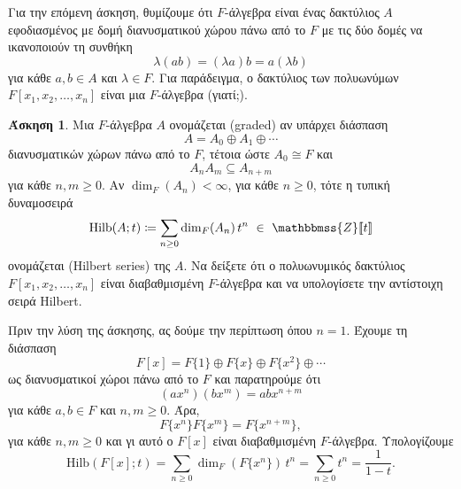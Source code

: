 \documentclass[12pt,a4paper,reqno]{amsart}
\theoremstyle{definition}
\newtheorem{exercise}{Άσκηση}
\newcommand{\ZZ}{\mathbbmss{Z}}
\renewcommand{\to}{\rightarrow}
\newcommand{\Hilb}{\mathrm{Hilb}}
\newcommand{\defn}[1]{{\color{mylightblue}{#1}}}
\begin{document}


Για την επόμενη άσκηση, θυμίζουμε ότι $F$-άλγεβρα είναι ένας δακτύλιος $A$ εφοδιασμένος με δομή διανυσματικού χώρου πάνω από το $F$ με τις δύο δομές να ικανοποιούν τη συνθήκη 
\[
\lambda(ab) = (\lambda{a})b = a(\lambda{b})
\]
για κάθε $a, b \in A$ και $\lambda \in F$. Για παράδειγμα, ο δακτύλιος των πολυωνύμων $F[x_1, x_2, \dots, x_n]$ είναι μια $F$-άλγεβρα (γιατί;).

\begin{exercise}
  \label{ex:hilbert_series}
Μια $F$-άλγεβρα $A$ ονομάζεται \defn{διαβαθμισμένη} (graded) αν υπάρχει διάσπαση 
\[
A = A_0 \oplus A_1 \oplus \cdots 
\]
διανυσματικών χώρων πάνω από το $F$, τέτοια ώστε $A_0 \cong F$ και 
\[
A_nA_m \subseteq A_{n+m}
\]
για κάθε $n, m \ge 0$. Αν $\dim_F(A_n) < \infty$, για κάθε $n \ge 0$, τότε η τυπική δυναμοσειρά 
\[
\Hilb(A;t) \coloneqq \sum_{n \ge 0} \dim_F(A_n) \, t^n \ \in \ \ZZ[\![t]\!]
\]
ονομάζεται \defn{σειρά Hilbert} (Hilbert series) της $A$. Να δείξετε ότι ο πολυωνυμικός δακτύλιος $F[x_1, x_2, \dots, x_n]$ είναι διαβαθμισμένη $F$-άλγεβρα και να υπολογίσετε την αντίστοιχη σειρά Hilbert.
\end{exercise}

Πριν την λύση της άσκησης, ας δούμε την περίπτωση όπου $n=1$. Έχουμε τη διάσπαση 
\[
F[x] = F\{1\} \oplus F\{x\} \oplus F\{x^2\} \oplus \cdots 
\]
ως διανυσματικοί χώροι πάνω από το $F$ και παρατηρούμε ότι 
\[
(ax^n)(bx^m) = abx^{n+m}
\]
για κάθε $a, b \in F$ και $n, m \ge 0$. Άρα, 
\[
F\{x^n\}F\{x^m\} = F\{x^{n+m}\},
\]
για κάθε $n, m \ge 0$ και γι αυτό ο $F[x]$ είναι διαβαθμισμένη $F$-άλγεβρα. Υπολογίζουμε 
\[
\Hilb(F[x]; t) = \sum_{n \ge 0} \dim_F(F\{x^n\}) \, t^n = \sum_{n\ge0}t^n = \frac{1}{1-t}.
\]
\end{document}
